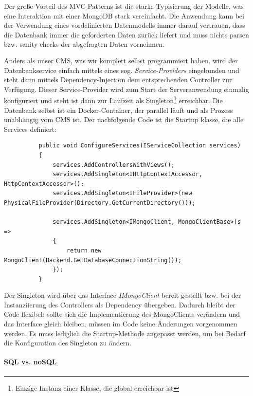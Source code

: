\documentclass[titlepage, a4paper, 11pt]{scrartcl}
\begin{document}
        Der große Vorteil des MVC-Patterns ist die starke Typisierung der Modelle, was eine Interaktion mit einer MongoDB stark vereinfacht.
        Die Anwendung kann bei der Verwendung eines vordefinierten Datenmodells immer darauf vertrauen, dass die Datenbank immer die geforderten Daten zurück liefert 
        und muss nichts parsen bzw. sanity checks der abgefragten Daten vornehmen.
        
        Anders als unser CMS, was wir komplett selbst programmiert haben, wird der Datenbankservice einfach mittels eines sog. \textit{Service-Providers} eingebunden
        und steht dann mittels Dependency-Injection dem entsprechenden Controller zur Verfügung. Dieser Service-Provider wird zum Start der Serveranwendung einmalig 
        konfiguriert und steht ist dann zur Laufzeit als Singleton\footnote{Einzige Instanz einer Klasse, die global erreichbar ist} erreichbar. Die Datenbank selbst ist ein Docker-Container,
        der parallel läuft und als Prozess unabhängig vom CMS ist. Der nachfolgende Code ist die Startup klasse, die alle Services definiert:

        \begin{lstlisting}          
          public void ConfigureServices(IServiceCollection services)
          {
              services.AddControllersWithViews();
              services.AddSingleton<IHttpContextAccessor, HttpContextAccessor>();
              services.AddSingleton<IFileProvider>(new PhysicalFileProvider(Directory.GetCurrentDirectory()));
  
              services.AddSingleton<IMongoClient, MongoClientBase>(s =>
              {
                  return new MongoClient(Backend.GetDatabaseConnectionString());
              });
          }
        \end{lstlisting}

        Der Singleton wird über das Interface \textit{IMongoClient} bereit gestellt bzw. bei der Instanziierung des Controllers als Dependency übergeben.
        Dadurch bleibt der Code flexibel: sollte sich die Implementierung des MongoClients verändern und das Interface gleich bleiben, müssen im Code keine Änderungen vorgenommen werden.
        Es muss lediglich die Startup-Methode angepasst werden, um bei Bedarf die Konfiguration des Singleton zu ändern.        

        \paragraph{SQL vs. noSQL}
\end{document}

